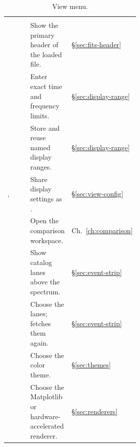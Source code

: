 \begin{xltabular}{\linewidth}{@{}P{0.36\linewidth} L P{0.17\linewidth}@{}}
  \caption{View menu.}\label{tab:menu-view}\\
  \toprule {} &  &  \\ \midrule\endfirsthead
  \toprule {} &  &  \\ \midrule\endhead
   & Show the primary header of the loaded file. & §\ref{sec:fits-header} \\
   & Enter exact time and frequency limits. & §\ref{sec:display-range} \\
   & Store and reuse named display ranges. & §\ref{sec:display-range} \\
  ,  & Share display settings as . & §\ref{sec:view-config} \\
   & Open the comparison workspace. & Ch.~\ref{ch:comparison} \\
   & Show catalog lanes above the spectrum. & §\ref{sec:event-strip} \\
   & Choose the lanes;  fetches them again. & §\ref{sec:event-strip} \\
   & Choose the color theme. & §\ref{sec:themes} \\
   & Choose the Matplotlib or hardware-accelerated renderer. & §\ref{sec:renderers} \\
  \bottomrule
\end{xltabular}

